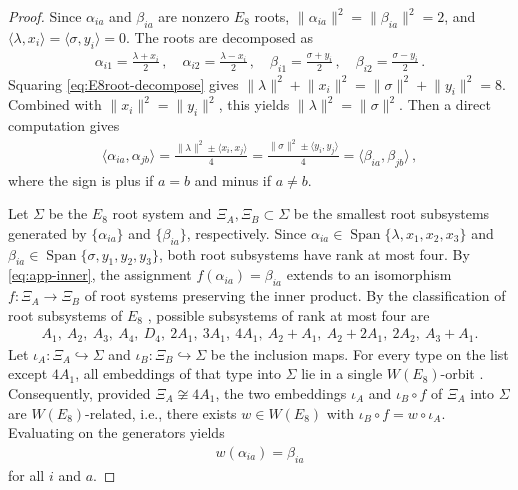 \documentclass[11pt, a4paper]{article}
\theoremstyle{definition}
\begin{document}
\begin{proof}
    Since $ \alpha_{ia} $ and $ \beta_{ia} $ are nonzero $ E_8 $ roots, $ \lVert \alpha_{ia} \rVert^2 = \lVert \beta_{ia} \rVert^2 = 2 $, and  $ \langle \lambda, x_i \rangle = \langle \sigma, y_i \rangle = 0 $. The roots are decomposed as 
    \begin{align}\label{eq:E8root-decompose}
        \alpha_{i1} = \frac{\lambda+x_i}{2} \, , \quad
        \alpha_{i2} = \frac{\lambda-x_i}{2} \, , \quad
        \beta_{i1} = \frac{\sigma+y_i}{2} \, , \quad
        \beta_{i2} = \frac{\sigma-y_i}{2} \, .
    \end{align}
    Squaring \eqref{eq:E8root-decompose} gives $ \lVert \lambda \rVert^2 + \lVert x_i \rVert^2 = \lVert\sigma\rVert^2 + \lVert y_i \rVert^2 = 8 $. Combined with $ \lVert x_i \rVert^2 = \lVert y_i \rVert^2 $, this yields $ \lVert \lambda \rVert^2 = \lVert \sigma \rVert^2 $. Then a direct computation gives 
    \begin{align}\label{eq:app-inner}
       \langle \alpha_{ia}, \alpha_{jb} \rangle = \frac{\lVert \lambda \rVert^2 \pm \langle x_i, x_j \rangle}{4} = \frac{\lVert \sigma \rVert^2 \pm \langle y_i, y_j \rangle}{4} = \langle \beta_{ia}, \beta_{jb} \rangle \, ,
    \end{align}
    where the sign is plus if $ a=b $ and minus if $ a\neq b $. 

    Let $ \Sigma $ be the $ E_8 $ root system and $ \Xi_A, \Xi_B \subset \Sigma $ be the smallest root subsystems generated by $ \{\alpha_{ia}\} $ and $ \{\beta_{ia}\} $, respectively. Since $ \alpha_{ia} \in \operatorname{Span}\{\lambda, x_1, x_2, x_3 \} $ and $ \beta_{ia} \in \operatorname{Span}\{\sigma, y_1,y_2,y_3\} $, both root subsystems have rank at most four. By \eqref{eq:app-inner}, the assignment $ f(\alpha_{ia}) = \beta_{ia} $ extends to an isomorphism $ f : \Xi_A \to \Xi_B $ of root systems preserving the inner product. By the classification of root subsystems of $ E_8 $ \cite{Oshima:2007}, possible subsystems of rank at most four are
    \begin{align}
        A_1,\ A_2,\ A_3,\ A_4,\ D_4,\ 2A_1,\ 3A_1,\ 4A_1,\ A_2+A_1,\ A_2+2A_1,\ 2A_2,\ A_3+A_1 .
    \end{align}
    Let $ \iota_A : \Xi_A \hookrightarrow \Sigma $ and $ \iota_B : \Xi_B \hookrightarrow \Sigma $ be the inclusion maps. For every type on the list except $ 4A_1 $, all embeddings of that type into $ \Sigma $ lie in a single $ W(E_8) $-orbit \cite{Oshima:2007}. Consequently, provided $ \Xi_A \not\cong 4A_1 $, the two embeddings $ \iota_A $ and $ \iota_B \circ f $ of $ \Xi_A $ into $ \Sigma $ are $ W(E_8) $-related, i.e., there exists $ w \in W(E_8) $ with $ \iota_B \circ f = w \circ \iota_A $. Evaluating on the generators yields
    \begin{align}
        w(\alpha_{ia}) = \beta_{ia}
    \end{align}
    for all $ i $ and $ a $.


\end{proof}
\end{document}
